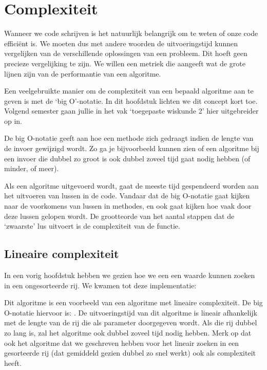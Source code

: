 \chapter{Complexiteit}
Wanneer we code schrijven is het natuurlijk belangrijk om te weten of onze code effici\"ent is. We moeten dus met andere woorden de uitvoeringstijd kunnen vergelijken van de verschillende oplossingen van een probleem. Dit hoeft geen precieze vergelijking te zijn.  We willen een metriek die aangeeft wat de grote lijnen zijn van de performantie van een algoritme.

Een veelgebruikte manier om de complexiteit van een bepaald algoritme aan te geven is met de `big O'-notatie. In dit hoofdstuk lichten we dit concept kort toe. Volgend semester gaan jullie in het vak `toegepaste wiskunde 2' hier uitgebreider op in.

De big O-notatie  geeft aan hoe een methode zich gedraagt indien de lengte van de invoer gewijzigd wordt. Zo ga je bijvoorbeeld kunnen zien of een algoritme bij een invoer die dubbel zo groot is ook dubbel zoveel tijd gaat nodig hebben (of minder, of meer).

Als een algoritme uitgevoerd wordt, gaat de meeste tijd gespendeerd worden aan het uitvoeren van lussen in de code. Vandaar dat de big O-notatie gaat kijken naar de voorkomens van lussen in methodes, en ook gaat kijken hoe vaak door deze lussen gelopen wordt. De grootteorde van het aantal stappen dat de `zwaarste' lus uitvoert is de complexiteit van de functie.

\section{Lineaire complexiteit}

In een vorig hoofdstuk hebben we gezien hoe we een een waarde kunnen zoeken in een ongesorteerde rij. We kwamen tot deze implementatie:


Dit algoritme is een voorbeeld van een algoritme met lineaire complexiteit. De big O-notatie hiervoor is: \compn. De uitvoeringstijd van dit algoritme is lineair afhankelijk met de lengte van de rij die als parameter doorgegeven wordt. Als die rij dubbel zo lang is, zal het algoritme ook dubbel zoveel tijd nodig hebben. Merk op dat ook het algoritme dat we geschreven hebben voor het lineair zoeken in een gesorteerde rij (dat gemiddeld gezien dubbel zo snel werkt) ook als complexiteit \compn heeft.

